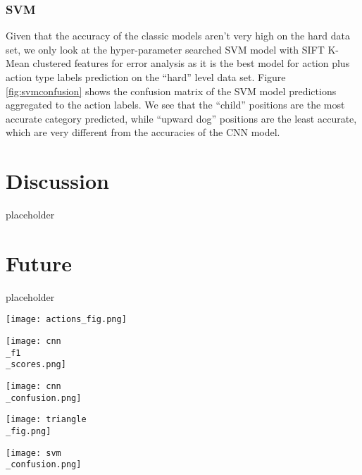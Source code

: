 \documentclass[
	a4paper, %
	10pt, %
	unnumberedsections, %
	twoside, %
]{t0004}
\begin{document}
\subsubsection{SVM} Given that the accuracy of the classic models aren't very high on the hard data set, we only look at the hyper-parameter searched SVM model with SIFT K-Mean clustered features for error analysis as it is the best model for action plus action type labels prediction on the ``hard'' level data set. Figure \ref{fig:svmconfusion} shows the confusion matrix of the SVM model predictions aggregated to the action labels. We see that the ``child'' positions are the most accurate category predicted, while ``upward dog'' positions are the least accurate, which are very different from the accuracies of the CNN model.

\section{Discussion}

placeholder

\section{Future}

placeholder






\begin{figure*}
	\texttt{[image: actions\_fig.png]}
	\caption{10 yoga poses, each with 4 different variants.}
	\label{fig:actionsfig}
\end{figure*}

\begin{figure*}
	\texttt{[image: cnn\\\_f1\\\_scores.png]}
	\caption{F1 scores of the CNN model across labels.}
	\label{fig:f1cnn}
\end{figure*}

\begin{figure*}
	\texttt{[image: cnn\\\_confusion.png]}
	\caption{CNN model confusion across ``triangle'' action labels.}
	\label{fig:f1cnn}
\end{figure*}

\begin{figure*}
	\texttt{[image: triangle\\\_fig.png]}
	\caption{CNN model confusion across ``triangle'' action labels.}
	\label{fig:trianglecnn}
\end{figure*}

\begin{figure*}
	\texttt{[image: svm\\\_confusion.png]}
	\caption{SVM model confusion matrix aggregated to the action labels.}
	\label{fig:svmconfusion}
\end{figure*}
\end{document}

